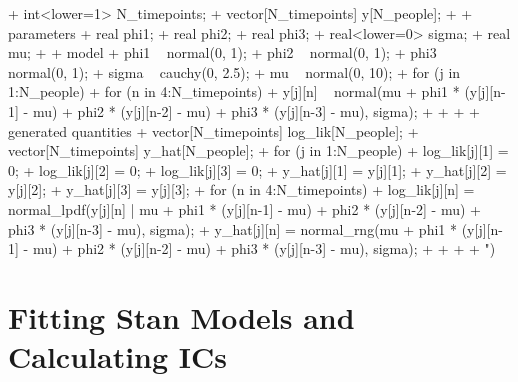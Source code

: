 \documentclass{article}
\begin{document}
\begin{Schunk}
\begin{Sinput}
{+   int<lower=1> N_timepoints;
+   vector[N_timepoints] y[N_people];
+ }
+ parameters {
+   real phi1;
+   real phi2;
+   real phi3;
+   real<lower=0> sigma;
+   real mu;
+ }
+ model {
+   phi1 ~ normal(0, 1);
+   phi2 ~ normal(0, 1);
+   phi3 ~ normal(0, 1);
+   sigma ~ cauchy(0, 2.5);
+   mu ~ normal(0, 10);
+   for (j in 1:N_people) {
+     for (n in 4:N_timepoints) {
+       y[j][n] ~ normal(mu + phi1 * (y[j][n-1] - mu) + phi2 * (y[j][n-2] - mu) + phi3 * (y[j][n-3] - mu), sigma);
+     }
+   }
+ }
+ generated quantities {
+   vector[N_timepoints] log_lik[N_people];
+   vector[N_timepoints] y_hat[N_people];
+   for (j in 1:N_people) {
+     log_lik[j][1] = 0;
+     log_lik[j][2] = 0;
+     log_lik[j][3] = 0;
+     y_hat[j][1] = y[j][1];
+     y_hat[j][2] = y[j][2];
+     y_hat[j][3] = y[j][3];
+     for (n in 4:N_timepoints) {
+       log_lik[j][n] = normal_lpdf(y[j][n] | mu + phi1 * (y[j][n-1] - mu) + phi2 * (y[j][n-2] - mu) + phi3 * (y[j][n-3] - mu), sigma);
+       y_hat[j][n] = normal_rng(mu + phi1 * (y[j][n-1] - mu) + phi2 * (y[j][n-2] - mu) + phi3 * (y[j][n-3] - mu), sigma);
+     }
+   }
+ }
+ ")
\end{Sinput}
\end{Schunk}


\section{Fitting Stan Models and Calculating ICs}
\end{document}
